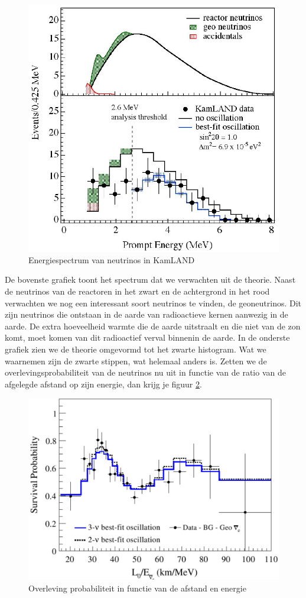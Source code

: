 \documentclass[../main.tex]{subfiles}
\begin{document}
\begin{figure}[h]
    \centering
    \includegraphics[width=0.5\linewidth]{neutrinos/kamland_results.png}
    \caption{Energiespectrum van neutrinos in KamLAND}%
    \label{fig:neutrinos/kamland_results}
\end{figure}

De bovenste grafiek toont het spectrum dat we verwachten uit de theorie. Naast de neutrinos van de reactoren in het zwart en de achtergrond in het rood verwachten we nog een interessant soort neutrinos te vinden, de geoneutrinos. Dit zijn neutrinos die ontstaan in de aarde van radioactieve kernen aanwezig in de aarde. De extra hoeveelheid warmte die de aarde uitstraalt en die niet van de zon komt, moet komen van dit radioactief verval binnenin de aarde. In de onderste grafiek zien we de theorie omgevormd tot het zwarte histogram. Wat we waarnemen zijn de zwarte stippen, wat helemaal anders is. Zetten we de overlevingsprobabiliteit van de neutrinos nu uit in functie van de ratio van de afgelegde afstand op zijn energie, dan krijg je figuur \ref{fig:neutrinos/kamland_osc}.

\begin{figure}[h]
    \centering
    \includegraphics[width=0.6\linewidth]{neutrinos/kamland_osc.png}
    \caption{Overleving probabiliteit in functie van de afstand en energie}%
    \label{fig:neutrinos/kamland_osc}
\end{figure}
\end{document}
